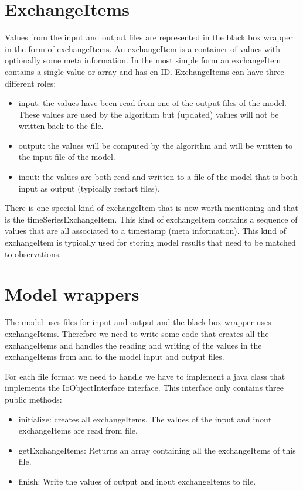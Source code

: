 \section{ExchangeItems}
Values from the input and output files are represented in the \oda black box
wrapper in the form of exchangeItems. An exchangeItem is a container of values
with optionally some meta information. In the most simple form an exchangeItem
contains a single value or array and has en ID. ExchangeItems can have three
different roles:
\begin{itemize}
\item input: the values have been read from one of the output files of the
  model. These values are used by the algorithm but (updated) values will not
  be written back to the file.
\item output: the values will be computed by the algorithm and will be written
  to the input file of the model.
\item inout: the values are both read and written to a file of the model that
  is both input as output (typically restart files).
\end{itemize}

There is one special kind of exchangeItem that is now worth mentioning and that
is the timeSeriesExchangeItem. This kind of exchangeItem contains a sequence of
values that are all associated to a timestamp (meta information). This kind of
exchangeItem is typically used for storing model results that need to be
matched to observations.

\section{Model wrappers}
The model uses files for input and output and the black box wrapper uses
exchangeItems. Therefore we need to write some code that creates all the
exchangeItems and handles the reading and writing of the values in the
exchangeItems from and to the model input and output files.

For each file format we need to handle we have to implement a java class that
implements the IoObjectInterface interface. This interface only contains three
public methods:
\begin{itemize}
\item initialize: creates all exchangeItems. The values of the input and inout
  exchangeItems are read from file.
\item getExchangeItems: Returns an array containing all the exchangeItems of
  this file.
\item finish: Write the values of output and inout exchangeItems to file.
\end{itemize}

